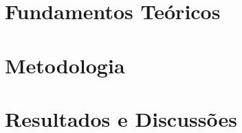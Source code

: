 \documentclass[
	12pt,				%
	openright,			%
	oneside,			%
	a4paper,			%
	english,			%
	french,				%
	spanish,			%
	brazil,				%
	]{abntex2}
\begin{document}


\part{Fundamentos Teóricos}







%

%




\part{Metodologia\label{cap:metodologia}}
%








\part{Resultados e Discussões}



% 




\postextual


\end{document}
